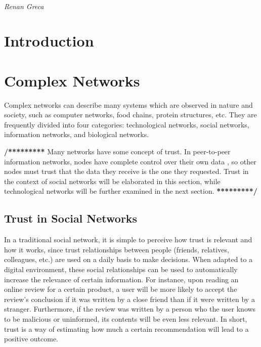 \documentclass{article}
\makeatletter
\newcommand{\name}{Renan Greca}
\newcommand{\email}{renangreca@gmail.com}
\makeatother
\begin{document}
\pagestyle{fancy}
\lhead{\name}
\chead{}
\rhead{\email}
\lfoot{}
\cfoot{\thepage}
\rfoot{}


\begin{center}
    \Large
    \textbf{} \\
    \textit{Renan Greca} \\
    \small
\end{center}

\large
\doublespacing

\section{Introduction}



\section{Complex Networks}
Complex networks can describe many systems which are observed in nature and society, such as computer networks, food chains, protein structures, etc. \cite{newmannetworks}
They are frequently divided into four categories: technological networks, social networks, information networks, and biological networks.

\textbf{/*********}
Many networks have some concept of trust.
In peer-to-peer information networks, nodes have complete control over their own data \cite{vernize2015malicious}, so other nodes must trust that the data they receive is the one they requested.
Trust in the context of social networks will be elaborated in this section, while technological networks will be further examined in the next section.
\textbf{*********/}

\subsection{Trust in Social Networks}
In a traditional social network, it is simple to perceive how trust is relevant and how it works, since trust relationships between people (friends, relatives, colleagues, etc.) are used on a daily basis to make decisions.
When adapted to a digital environment, these social relationships can be used to automatically increase the relevance of certain information.
For instance, upon reading an online review for a certain product, a user will be more likely to accept the review's conclusion if it was written by a close friend than if it were written by a stranger.
Furthermore, if the review was written by a person who the user knows to be malicious or uninformed, its contents will be even less relevant.
In short, trust is a way of estimating how much a certain recommendation will lead to a positive outcome. \cite{golbeck2006inferring}
\end{document}
